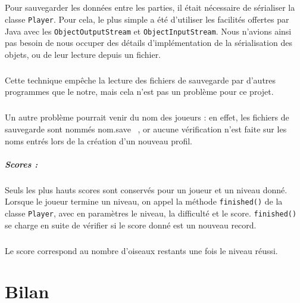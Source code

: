 \documentclass[a4paper,12pt]{report}
\begin{document}
\paragraph{}Pour sauvegarder les données entre les parties, il était nécessaire de sérialiser la classe \verb+Player+. Pour cela, le plus simple a été d'utiliser les facilités offertes par Java avec les \verb+ObjectOutputStream+ et \verb+ObjectInputStream+. Nous n'avions ainsi pas besoin de nous occuper des détails d'implémentation de la sérialisation des objets, ou de leur lecture depuis un fichier.

\paragraph{}Cette technique empêche la lecture des fichiers de sauvegarde par d'autres programmes que le notre, mais cela n'est pas un problème pour ce projet.

\paragraph{}Un autre problème pourrait venir du nom des joueurs : en effet, les fichiers de sauvegarde sont nommés \guillemotleft nom.save\guillemotright~ , or aucune vérification n'est faite sur les noms entrés lors de la création d'un nouveau profil.

\paragraph{Scores :}
\paragraph{}Seuls les plus hauts scores sont conservés pour un joueur et un niveau donné. Lorsque le joueur termine un niveau, on appel la méthode \verb+finished()+ de la classe \verb+Player+, avec en paramètres le niveau, la difficulté et le score. \verb+finished()+ se charge en suite de vérifier si le score donné est un nouveau record.

\paragraph{}Le score correspond au nombre d'oiseaux restants une fois le niveau réussi.

\chapter{Bilan}
\end{document}
